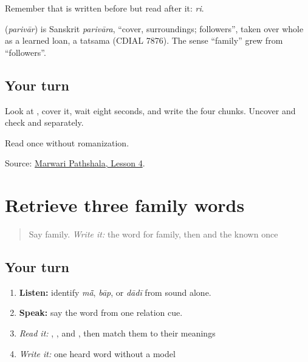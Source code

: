Remember that \textbf{} is written before \textbf{} but read after it: \emph{ri}.

\begin{cousinweb}
\textbf{} (\emph{parivār}) is Sanskrit \emph{parivāra}, \textquotedblleft{}cover, surroundings; followers\textquotedblright{}, taken over whole as a learned loan, a tatsama (CDIAL 7876). The sense \textquotedblleft{}family\textquotedblright{} grew from \textquotedblleft{}followers\textquotedblright{}.
\end{cousinweb}

\subsection*{Your turn}
Look at \textbf{}, cover it, wait eight seconds, and write the four chunks. Uncover and check \textbf{} and \textbf{} separately.

\begin{tcolorbox}[breakable,colback=teal!4,colframe=teal!35!black,title={Before you move on}]
Read \textbf{} once without romanization.

Source: \href{https://www.marwaripathshala.com/marwari-lesson-4-english}{Marwari Pathshala, Lesson 4}.
\end{tcolorbox}
\section[Practice]{Retrieve three family words}

\label{lesson:MW-R08-family-foundation}



\begin{quote}
Say family. \emph{Write it:} the word for family, then \textbf{} and the known \textbf{ } once
\end{quote}

\subsection*{Your turn}
\begin{enumerate}
\raggedright
  \item \textbf{Listen:} identify \emph{mā̃}, \emph{bāp}, or \emph{dādī} from sound alone.
  \item \textbf{Speak:} say the word from one relation cue.
  \item \emph{Read it:} \textbf{}, \textbf{}, and \textbf{}, then match them to their meanings
  \item \emph{Write it:} one heard word without a model
\end{enumerate}

